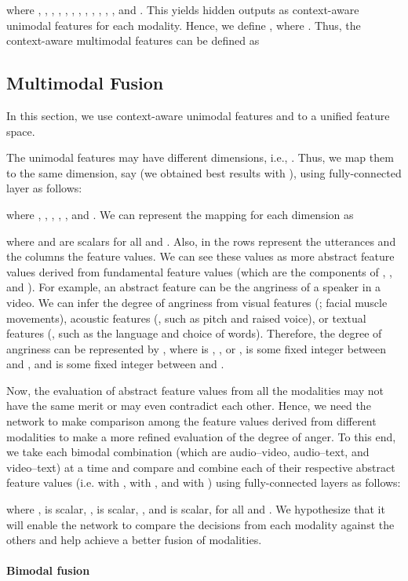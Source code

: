 \documentclass[review]{elsarticle}
\newcommand\?[1]{\hl{#1}}
\begin{document}
where , , , , , , ,
, , , , ,
and . This yields hidden outputs  as
context-aware unimodal features for each modality. Hence, we define
, where . Thus, the
context-aware multimodal features can be defined as


\subsection{Multimodal Fusion}
\label{sec:mul_fusion}

In this section, we use context-aware unimodal features  and  to
a unified feature space.

The unimodal features may have different dimensions, i.e., . Thus, we map them to the same dimension, say  (we obtained best
results with ), using fully-connected layer as follows:

where , , , , , and . We can represent
the mapping for each dimension as

where  and  are scalars for all  and
. Also, in  the rows represent the utterances and the
columns the feature values. We can see these values  as more abstract
feature values derived from fundamental feature values (which are the components
of , , and ). For example, an abstract feature can be the
angriness of a speaker in a video. We can infer the degree of angriness from
visual features (; facial muscle movements), acoustic features (,
such as pitch and raised voice), or textual features (, such as the language and choice of
words). Therefore, the degree of angriness can be represented by ,
where  is , , or ,  is some fixed integer between  and , and  is some
fixed integer between  and .

Now, the evaluation of abstract feature values from all the modalities may not
have the same merit or may even contradict each other. Hence, we need the network
to make comparison among the feature values derived from different modalities to
make a more refined evaluation of the degree of anger. To this end, we take
each bimodal combination (which are audio--video, audio--text, and video--text)  at
a time and compare and combine each of their respective abstract feature values
(i.e.  with ,  with , and 
with ) using fully-connected layers as follows:

where ,  is scalar, ,  is scalar, , and 
is scalar, for all  and . We hypothesize that it
will enable the network to compare the decisions from each modality against the
others and help achieve a better fusion of modalities.

\paragraph{\textbf{Bimodal fusion}}
\label{sec:bimodal}
\end{document}
